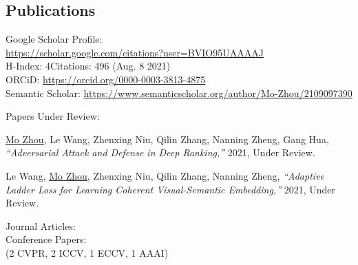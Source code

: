 \documentclass[margin,line,pifont,palatino,courier]{res}
\begin{document}
\begin{resume}

%


\section{\sc Publications}
	Google Scholar Profile:\\
	\url{https://scholar.google.com/citations?user=BVIO95UAAAAJ}\\
	H-Index: 4\qquad Citations: 496 (Aug. 8 2021)\\
	ORCiD: \url{https://orcid.org/0000-0003-3813-4875}\\
	Semantic Scholar: {\small\url{https://www.semanticscholar.org/author/Mo-Zhou/2109097390}}

	{\sc Papers Under Review:}\\

\begin{enumerate}[noitemsep, leftmargin=*, label={[J0{\arabic*}]}]

\item \underline{Mo Zhou}, Le Wang, Zhenxing Niu, Qilin Zhang, Nanning Zheng, Gang Hua,
\textit{``Adversarial Attack and Defense in Deep Ranking,''}
2021, Under Review.

\item Le Wang, \underline{Mo Zhou}, Zhenxing Niu, Qilin Zhang, Nanning Zheng,
\textit{``Adaptive Ladder Loss for Learning Coherent Visual-Semantic Embedding,''}
2021, Under Review.

\end{enumerate}

	{\sc Journal Articles:}\\

	{\sc Conference Papers:}\\
	(2 CVPR, 2 ICCV, 1 ECCV, 1 AAAI)


\end{resume}
\end{document}
